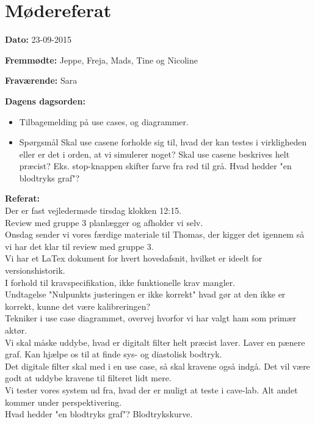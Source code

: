 \chapter{Mødereferat}

\textbf{Dato:} 23-09-2015

\textbf{Fremmødte:} Jeppe, Freja, Mads, Tine og Nicoline

\textbf{Fraværende:} Sara

\textbf{Dagens dagsorden:}
\begin{itemize}
	\item Tilbagemelding på use cases, og diagrammer.
	\item Spørgsmål
	\subitem Skal use casene forholde sig til, hvad der kan testes i virkligheden eller er det i orden, at vi simulerer noget?
	\subitem Skal use casene beskrives helt præcist? Eks. stop-knappen skifter farve fra rød til grå.
	\subitem Hvad hedder "en blodtryks graf"?\\
\end{itemize}

\textbf{Referat:}
\\Der er fast vejledermøde tirsdag klokken 12:15.
\\Review med gruppe 3 planlægger og afholder vi selv.
\\Onsdag sender vi vores færdige materiale til Thomas, der kigger det igennem så vi har det klar til review med gruppe 3.
\\Vi har et LaTex dokument for hvert hovedafsnit, hvilket er ideelt for versionshistorik.
\\I forhold til kravspecifikation, ikke funktionelle krav mangler.
\\Undtagelse "Nulpunkts justeringen er ikke korrekt" hvad gør at den ikke er korrekt, kunne det være kalibreringen?
\\Tekniker i use case diagrammet, overvej hvorfor vi har valgt ham som primær aktør.
\\Vi skal måske uddybe, hvad er digitalt filter helt præcist laver. Laver en pænere graf. Kan hjælpe os til at finde sys- og diastolisk bodtryk.
\\Det digitale filter skal med i en use case, så skal kravene også indgå. Det vil være godt at uddybe kravene til filteret lidt mere.
\\Vi tester vores system ud fra, hvad der er muligt at teste i cave-lab. Alt andet kommer under perspektivering. 
\\Hvad hedder "en blodtryks graf"? Blodtrykskurve.



